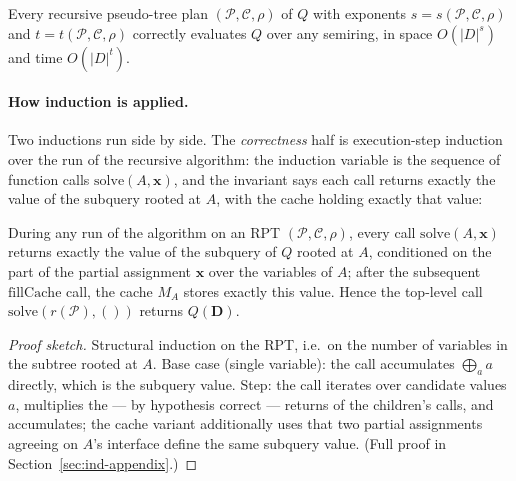 \begin{theorem}\label{thm:ind-rpt}
Every recursive pseudo-tree plan $(\mathcal{P},\mathcal{C},\rho)$ of $Q$ with exponents
$s = s(\mathcal{P},\mathcal{C},\rho)$ and $t = t(\mathcal{P},\mathcal{C},\rho)$
correctly evaluates $Q$ over any semiring, in space $O(|D|^{s})$ and time
$O(|D|^{t})$. \eop
\end{theorem}


\paragraph{How induction is applied.}
Two inductions run side by side. The \emph{correctness} half is execution-step
induction over the run of the recursive algorithm: the induction variable is the
sequence of function calls $\mathrm{solve}(A, \mathbf{x})$, and the invariant says each
call returns exactly the value of the subquery rooted at $A$, with the cache holding
exactly that value:

\begin{lemma}\label{lem:ind-rpt-cache}
During any run of the algorithm on an RPT $(\mathcal{P},\mathcal{C},\rho)$, every call
$\mathrm{solve}(A, \mathbf{x})$ returns exactly the value of the subquery of $Q$
rooted at $A$, conditioned on the part of the partial assignment $\mathbf{x}$ over the
variables of $A$; after the subsequent $\mathrm{fillCache}$ call, the cache $M_A$
stores exactly this value. Hence the top-level call
$\mathrm{solve}(r(\mathcal{P}), ())$ returns $Q(\mathbf{D})$. \eop
\end{lemma}

\begin{proof}[Proof sketch]
Structural induction on the RPT, i.e.\ on the number of variables in the subtree
rooted at $A$. Base case (single variable): the call accumulates
$\bigoplus_{a} a$ directly, which is the subquery value. Step: the call iterates over
candidate values $a$, multiplies the --- by hypothesis correct --- returns of the
children's calls, and accumulates; the cache variant additionally uses that two partial
assignments agreeing on $A$'s interface define the same subquery value. (Full proof in
Section~\ref{sec:ind-appendix}.)
\end{proof}

